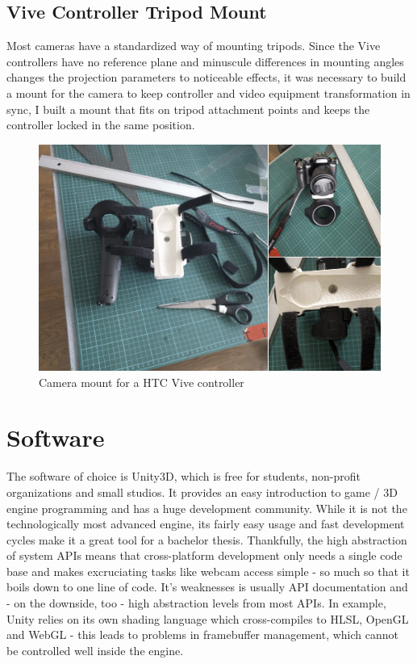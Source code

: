 \subsection{Vive Controller Tripod Mount}
Most cameras have a standardized way of mounting tripods. Since the Vive 
controllers have no reference plane and minuscule differences in mounting 
angles changes the projection parameters to noticeable effects, it was 
necessary to build a mount for the camera to keep controller and video 
equipment transformation in sync, I built a mount that fits on tripod 
attachment points and keeps the controller locked in the same position.

\begin{figure}[htb]
	\includegraphics[width=\textwidth]{_raw_resources/ViveStrap-Mount.png}
	\caption{Camera mount for a HTC Vive controller}
	\label{fig:system:camera-mount}
\end{figure}

\section{Software}

The software of choice is Unity3D, which is free for students, non-profit 
organizations and small studios. It provides an easy introduction to game / 3D 
engine programming and has a huge development community. While it is not the 
technologically most advanced engine, its fairly easy usage and fast 
development cycles make it a great tool for a bachelor thesis.
\newline
Thankfully, the high abstraction of system APIs means that cross-platform 
development only needs a single code base and makes excruciating tasks like 
webcam access simple - so much so that it boils down to one line of code.
\newline
It's weaknesses is usually API documentation and - on the downside, too - high 
abstraction levels from most APIs. In example, Unity relies on its own shading 
language which cross-compiles to HLSL, OpenGL and WebGL - this leads to 
problems in framebuffer management, which cannot be controlled well inside the 
engine.


